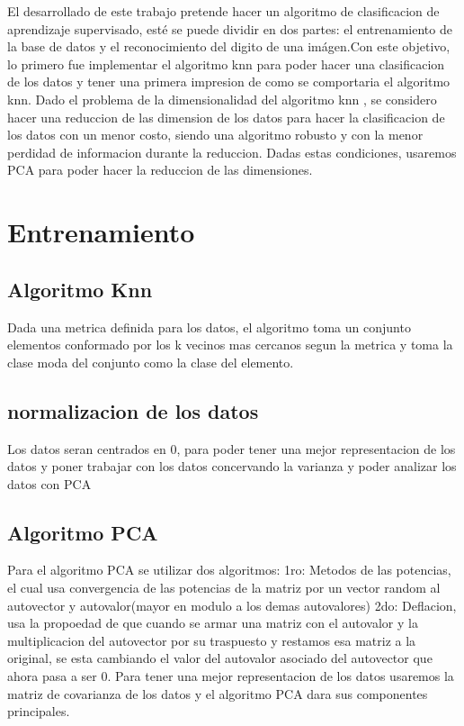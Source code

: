 El desarrollado de este trabajo pretende hacer un algoritmo de clasificacion de
aprendizaje supervisado, esté se puede dividir en dos partes: el entrenamiento
de la base de datos y el reconocimiento del digito de una imágen.Con este
objetivo, lo primero fue implementar el algoritmo knn para poder hacer una
clasificacion de los datos y tener una primera impresion de como se comportaria
el algoritmo knn. Dado el problema de la dimensionalidad del algoritmo knn , se
considero hacer una reduccion de las dimension de los datos para hacer la
clasificacion de los datos con un menor costo, siendo una algoritmo robusto y
con la menor perdidad de informacion durante la reduccion. Dadas estas
condiciones, usaremos PCA para poder hacer la reduccion de las dimensiones.  


\section{Entrenamiento}

\subsection{Algoritmo Knn}
Dada una metrica definida para los datos, el algoritmo toma un conjunto
elementos conformado por los k vecinos mas cercanos segun la metrica y toma la clase moda del conjunto como la clase del elemento. 

\subsection{normalizacion de los datos}
Los datos seran centrados en 0, para poder tener una mejor representacion de los
datos y poner trabajar con los datos concervando la varianza y poder analizar
los datos con PCA

\subsection{Algoritmo PCA}
Para el algoritmo PCA se utilizar dos algoritmos:
1ro: Metodos de las potencias, el cual usa convergencia de las potencias de
la matriz por un vector random al autovector y  autovalor(mayor en modulo a los
demas autovalores)
2do: Deflacion, usa la propoedad de que cuando se armar una matriz con el autovalor
y la multiplicacion del autovector por su traspuesto y restamos esa matriz a la
original, se esta cambiando el valor del autovalor asociado del autovector que
ahora pasa a ser 0.
Para tener una mejor representacion de los datos usaremos la matriz de
covarianza de los datos y el algoritmo PCA dara sus componentes principales. 

